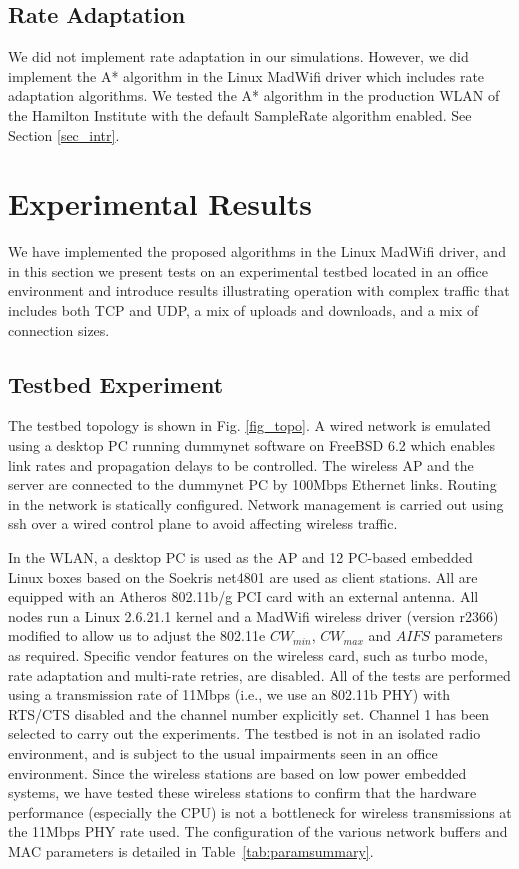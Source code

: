\documentclass[10pt,twocolumn, journal]{IEEEtran}
\begin{document}
\subsection{Rate Adaptation}
We did not implement rate adaptation in our simulations.  However, we did implement the
A* algorithm in the Linux MadWifi driver which includes rate adaptation algorithms.  We
tested the A* algorithm in the production WLAN of the Hamilton Institute with the default
SampleRate algorithm enabled. See Section \ref{sec_intr}.

\section{Experimental Results} \label{sec_expt}

We have implemented the proposed algorithms in the Linux MadWifi driver, and in this section we
present tests on an experimental testbed located in an office environment and introduce
results illustrating operation with complex traffic that includes both TCP and UDP, a mix
of uploads and downloads, and a mix of connection sizes.

\subsection{Testbed Experiment}
The testbed topology is shown in Fig. \ref{fig_topo}. A wired network is emulated using
a desktop PC running dummynet software on FreeBSD 6.2 which enables link rates and
propagation delays to be controlled. The wireless AP and the server are connected to the
dummynet PC by 100Mbps Ethernet links.  Routing in the network is statically configured.
Network management is carried out using ssh over a wired control plane to avoid affecting
wireless traffic.

In the WLAN, a desktop PC is used as the AP and 12 PC-based embedded Linux boxes based on
the Soekris net4801 are used as client stations. All are equipped with an Atheros
802.11b/g PCI card with an external antenna. All nodes run a Linux 2.6.21.1 kernel and a
MadWifi wireless driver (version r2366) modified to allow us to adjust the 802.11e
$CW_{min}$, $CW_{max}$ and $AIFS$ parameters as required. Specific vendor features on the
wireless card, such as turbo mode, rate adaptation and multi-rate retries, are disabled.
All of the tests are performed using a transmission rate of 11Mbps (i.e., we use an
802.11b PHY) with RTS/CTS disabled and the channel number explicitly set. Channel 1 has
been selected to carry out the experiments. The testbed is not in an isolated radio
environment, and is subject to the usual impairments seen in an office environment. Since
the wireless stations are based on low power embedded systems, we have tested these
wireless stations to confirm that the hardware performance (especially the CPU) is not a
bottleneck for wireless transmissions at the 11Mbps PHY rate used. The configuration of
the various network buffers and MAC parameters is detailed in
Table~\ref{tab:paramsummary}.
\end{document}
